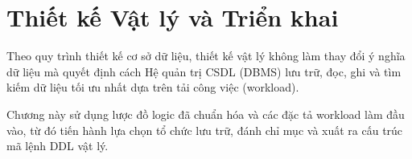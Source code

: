 \chapter{Thiết kế Vật lý và Triển khai}

Theo quy trình thiết kế cơ sở dữ liệu, thiết kế vật lý không làm thay đổi ý nghĩa dữ liệu mà quyết định cách Hệ quản trị CSDL (DBMS) lưu trữ, đọc, ghi và tìm kiếm dữ liệu tối ưu nhất dựa trên tải công việc (workload). 

Chương này sử dụng lược đồ logic đã chuẩn hóa và các đặc tả workload làm đầu vào, từ đó tiến hành lựa chọn tổ chức lưu trữ, đánh chỉ mục và xuất ra cấu trúc mã lệnh DDL vật lý.







